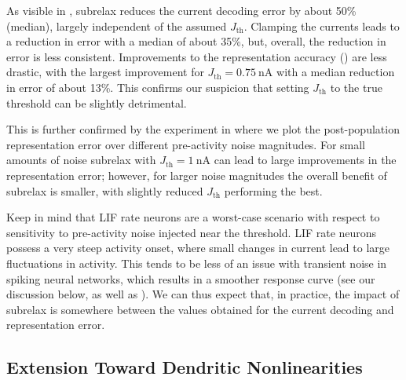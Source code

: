 As visible in , \gls{subrelax} reduces the current decoding error by about 50\% (median), largely independent of the assumed $J_\mathrm{th}$.
Clamping the currents leads to a reduction in error with a median of about 35\%, but, overall, the reduction in error is less consistent.
Improvements to the representation accuracy () are less drastic, with the largest improvement for $J_\mathrm{th} = \SI{0.75}{\nano\ampere}$ with a median reduction in error of about 13\%.
This confirms our suspicion that setting $J_\mathrm{th}$ to the true threshold can be slightly detrimental.

This is further confirmed by the experiment in  where we plot the post-population representation error over different pre-activity noise magnitudes.
For small amounts of noise \gls{subrelax} with $J_\mathrm{th} = \SI{1}{\nano\ampere}$ can lead to large improvements in the representation error; however, for larger noise magnitudes the overall benefit of \gls{subrelax} is smaller, with slightly reduced $J_\mathrm{th}$ performing the best.

Keep in mind that LIF rate neurons are a worst-case scenario with respect to sensitivity to pre-activity noise injected near the threshold.
LIF rate neurons possess a very steep activity onset, where small changes in current lead to large fluctuations in activity.
This tends to be less of an issue with transient noise in spiking neural networks, which results in a smoother response curve (see our discussion below, as well as \cite{hunsberger2015spiking}).
We can thus expect that, in practice, the impact of \gls{subrelax} is somewhere between the values obtained for the current decoding and representation error.

\subsection{Extension Toward Dendritic Nonlinearities}
\label{sec:nef_nonlinear}

